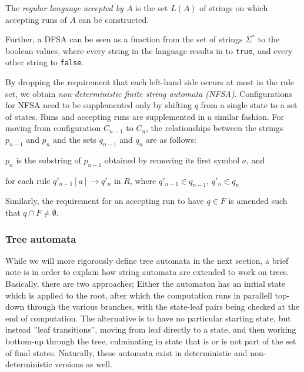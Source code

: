 The \emph{regular language accepted by $A$} is the set $L(A)$ of strings on
which accepting runs of $A$ can be constructed.

Further, a DFSA can be seen as a function from the set of strings
$\Sigma^*$ to the boolean values, where every string in the language
results in to \texttt{true}, and every other string to \texttt{false}.

By dropping the requirement that each left-hand side occurs at most in the
rule set, we obtain \emph{non-deterministic finite string automata (NFSA)}.
Configurations for NFSA need to be supplemented only by shifting $q$ from a
single state to a set of states. Runs and accepting runs are supplemented
in a similar fashion. For moving from configuration $C_{n-1}$ to $C_n$, the
relationships between the strings $p_{n-1}$ and $p_n$ and the sets
$q_{n-1}$ and $q_n$ are as follows:
\begin{compactitem}
\item $p_n$ is the substring of $p_{n-1}$ obtained by removing its first symbol
$a$, and
\item for each rule 
$q'_{n-1}[a] \rightarrow q'_n$
in $R$, where $q'_{n-1} \in q_{n-1}$, $q'_n \in q_n$
\end{compactitem}
Similarly, the requirement for an accepting run to have $q \in F$ is
amended such that $q \cap F \neq \emptyset$.

\subsubsection{Tree automata}

While we will more rigorously define tree automata in the next section, a
brief note is in order to explain how string automata are extended to work
on trees. Basically, there are two approaches; Either the automaton has an
initial state which is applied to the root, after which the computation
runs in parallell top-down through the various branches, with the
state-leaf pairs being checked at the end of computation. The alternative
is to have no particular starting state, but instead ''leaf transitions'',
moving from leaf directly to a state, and then working bottom-up through
the tree, culminating in state that is or is not part of the set of final
states. Naturally, these automata exist in deterministic and
non-deterministic versions as well. 

